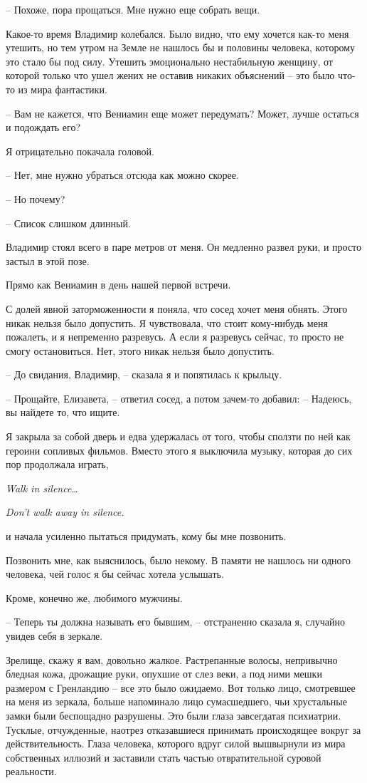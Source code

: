\documentclass[
]{book}
\begin{document}
-- Похоже, пора прощаться. Мне нужно еще собрать вещи.

Какое-то время Владимир колебался. Было видно, что ему хочется как-то меня утешить, но тем утром на Земле не нашлось бы и половины человека, которому это стало бы под силу. Утешить эмоционально нестабильную женщину, от которой только что ушел жених не оставив никаких объяснений -- это было что-то из мира фантастики.

-- Вам не кажется, что Вениамин еще может передумать? Может, лучше остаться и подождать его?

Я отрицательно покачала головой.

-- Нет, мне нужно убраться отсюда как можно скорее.

-- Но почему?

-- Список слишком длинный.

Владимир стоял всего в паре метров от меня. Он медленно развел руки, и просто застыл в этой позе.

Прямо как Вениамин в день нашей первой встречи.

С долей явной заторможенности я поняла, что сосед хочет меня обнять. Этого никак нельзя было допустить. Я чувствовала, что стоит кому-нибудь меня пожалеть, и я непременно разревусь. А если я разревусь сейчас, то просто не смогу остановиться. Нет, этого никак нельзя было допустить.

-- До свидания, Владимир, -- сказала я и попятилась к крыльцу.

-- Прощайте, Елизавета, -- ответил сосед, а потом зачем-то добавил: -- Надеюсь, вы найдете то, что ищите.

Я закрыла за собой дверь и едва удержалась от того, чтобы сползти по ней как героини сопливых фильмов. Вместо этого я выключила музыку, которая до сих пор продолжала играть,

\emph{Walk in silence\ldots{}}

\emph{Don't walk away in silence.}

и начала усиленно пытаться придумать, кому бы мне позвонить.

Позвонить мне, как выяснилось, было некому. В памяти не нашлось ни одного человека, чей голос я бы сейчас хотела услышать.

Кроме, конечно же, любимого мужчины.

-- Теперь ты должна называть его бывшим, -- отстраненно сказала я, случайно увидев себя в зеркале.

Зрелище, скажу я вам, довольно жалкое. Растрепанные волосы, непривычно бледная кожа, дрожащие руки, опухшие от слез веки, а под ними мешки размером с Гренландию -- все это было ожидаемо. Вот только лицо, смотревшее на меня из зеркала, больше напоминало лицо сумасшедшего, чьи хрустальные замки были беспощадно разрушены. Это были глаза завсегдатая психиатрии. Тусклые, отчужденные, наотрез отказавшиеся принимать происходящее вокруг за действительность. Глаза человека, которого вдруг силой вышвырнули из мира собственных иллюзий и заставили стать частью отвратительной суровой реальности.
\end{document}
